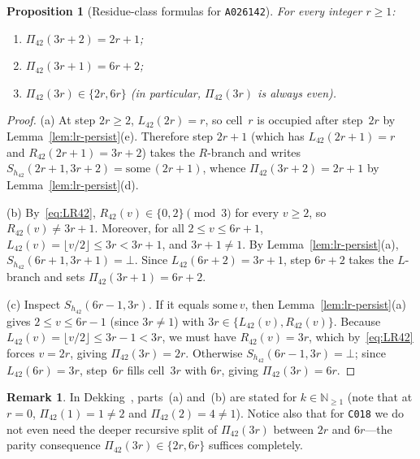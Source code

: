 \documentclass[11pt]{article}
\newtheorem{proposition}[theorem]{Proposition}
\theoremstyle{definition}
\newtheorem{remark}[theorem]{Remark}
\newcommand{\N}{\mathbb{N}}
\newcommand{\seq}[1]{\texttt{#1}}
\begin{document}
\begin{proposition}[Residue-class formulas for \seq{A026142}]
\label{prop:a026142}
For every integer $r \ge 1$:
\begin{enumerate}
\item[\textup{(a)}] $\Pi_{42}(3r + 2) = 2r + 1$;
\item[\textup{(b)}] $\Pi_{42}(3r + 1) = 6r + 2$;
\item[\textup{(c)}] $\Pi_{42}(3r) \in \{2r, 6r\}$ (in particular, $\Pi_{42}(3r)$ is always even).
\end{enumerate}
\end{proposition}

\begin{proof}
(a) At step $2r \ge 2$, $L_{42}(2r) = r$, so cell~$r$ is occupied after step~$2r$ by Lemma~\ref{lem:lr-persist}(e). Therefore step $2r + 1$ (which has $L_{42}(2r + 1) = r$ and $R_{42}(2r + 1) = 3r + 2$) takes the $R$-branch and writes $S_{h_{42}}(2r + 1, 3r + 2) = \mathrm{some}\,(2r + 1)$, whence $\Pi_{42}(3r + 2) = 2r + 1$ by Lemma~\ref{lem:lr-persist}(d).

(b) By~\eqref{eq:LR42}, $R_{42}(v) \in \{0, 2\} \pmod{3}$ for every $v \ge 2$, so $R_{42}(v) \ne 3r + 1$. Moreover, for all $2 \le v \le 6r + 1$, $L_{42}(v) = \lfloor v/2 \rfloor \le 3r < 3r + 1$, and $3r + 1 \ne 1$. By Lemma~\ref{lem:lr-persist}(a), $S_{h_{42}}(6r + 1, 3r + 1) = \bot$. Since $L_{42}(6r + 2) = 3r + 1$, step $6r + 2$ takes the $L$-branch and sets $\Pi_{42}(3r + 1) = 6r + 2$.

(c) Inspect $S_{h_{42}}(6r - 1, 3r)$. If it equals $\mathrm{some}\,v$, then Lemma~\ref{lem:lr-persist}(a) gives $2 \le v \le 6r - 1$ (since $3r \ne 1$) with $3r \in \{L_{42}(v), R_{42}(v)\}$. Because $L_{42}(v) = \lfloor v/2 \rfloor \le 3r - 1 < 3r$, we must have $R_{42}(v) = 3r$, which by~\eqref{eq:LR42} forces $v = 2r$, giving $\Pi_{42}(3r) = 2r$. Otherwise $S_{h_{42}}(6r - 1, 3r) = \bot$; since $L_{42}(6r) = 3r$, step~$6r$ fills cell~$3r$ with $6r$, giving $\Pi_{42}(3r) = 6r$.
\end{proof}

\begin{remark}
In Dekking~\cite[Theorem~9]{dekking2020}, parts~(a) and~(b) are stated for $k \in \N_{\ge 1}$ (note that at $r = 0$, $\Pi_{42}(1) = 1 \ne 2$ and $\Pi_{42}(2) = 4 \ne 1$). Notice also that for \texttt{C018} we do not even need the deeper recursive split of $\Pi_{42}(3r)$ between $2r$ and $6r$—the parity consequence $\Pi_{42}(3r) \in \{2r, 6r\}$ suffices completely.
\end{remark}
\end{document}
